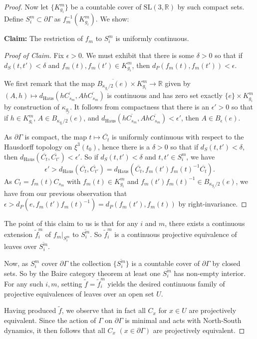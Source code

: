 \documentclass[12pt,a4paper]{amsart}
\theoremstyle{definition}
\theoremstyle{plain}
\numberwithin{equation}{section}
\begin{document}
\begin{proof}
    Now let $\{ K_{g_i}^m\}$ be a countable cover of $\text{SL}(3,\mathbb{R})$ by such compact sets. Define $S_i^m \subset \partial \Gamma$ as $f_m^{-1}(K_{g_i}^m)$. We show:

    \textbf{Claim:} The restriction of $f_m$ to $S_i^m$ is uniformly continuous.

    \begin{proof}[Proof of Claim]
    Fix $\epsilon > 0$. We must exhibit that there is some $\delta > 0$ so that if $d_S(t, t') < \delta$ and $f_m(t), f_m(t') \in K_{g_i}^m$, then $d_P(f_m(t), f_m(t')) < \epsilon$.

    We first remark that the map $\overline{B_{\kappa_{g_i}/2}(e)} \times K_{g_i}^m \to \mathbb{R}$ given by $(A,h) \mapsto d_{\text{Haus}}(h\overline{C_{s_m}}, Ah\overline{C_{s_m}})$ is continuous and has zero set exactly $\{e\} \times K_{g_i}^m$ by construction of $\kappa_{g_i}$. It follows from compactness that there is an $\epsilon'> 0$ so that if $ h \in K_{g_i}^m$, $A \in \overline{B_{\kappa_{g_i}/2}(e)}$, and $d_{\text{Haus}}(h\overline{C_{s_m}}, Ah\overline{C_{s_m}}) < \epsilon'$, then $A \in B_\epsilon(e)$.

    As $\partial \Gamma$ is compact, the map $t \mapsto \overline{C_t}$ is uniformly continuous with respect to the Hausdorff topology on $\xi^3(t_0)$, hence there is a $\delta > 0$ so that if $d_S(t,t') < \delta$, then $d_{\text{Haus}}(\overline{C_t}, \overline{C_{t'}}) < \epsilon'$. So if $d_S(t,t') < \delta$ and $t,t' \in S_i^m$, we have $$\epsilon' > d_{\text{Haus}}(\overline{C_t}, \overline{C_{t'}}) = d_\text{Haus}( \overline{C_t}, f_m(t') f_m(t)^{-1} \overline{C_{t}}).$$ As $C_t = f_m(t) C_{s_m}$ with $f_m(t) \in K_{g_i}^m$ and $f_m(t') f_m(t)^{-1} \in B_{\kappa_{g_i}/2}(e)$, we have from our previous observation that $\epsilon > d_P(e, f_m(t') f_m(t)^{-1}) = d_P(f_m(t'), f_m(t))$ by right-invariance.
    \end{proof}

    The point of this claim to us is that for any $i$ and $m$, there exists a continuous extension $\widetilde{f}_i^m$ of $f_m|_{S_i^m}$ to $\overline{S_i^m}.$ So  $\widetilde{f}_i^m$ is a continuous projective equivalence of leaves over $\overline{S_i^m}$.

    Now, as $S_i^m$ cover $\partial \Gamma$ the collection $\{ \overline{S_i^m}\}$ is a countable cover of $\partial \Gamma$ by closed sets. So by the Baire category theorem at least one $\overline{S_i^m}$ has non-empty interior. For any such $i,m$, setting $\widetilde{f} = \widetilde{f}_i^m$ yields the desired continuous family of projective equivalences of leaves over an open set $U$.

    Having produced $\widetilde{f}$, we observe that in fact all $C_x$ for $x\in U$ are projectively equivalent. Since the action of $\Gamma$ on $\partial \Gamma$ is minimal and acts with North-South dynamics, it then follows that all $C_x$ $(x \in \partial \Gamma)$ are projectively equivalent.
\end{proof}
\end{document}
